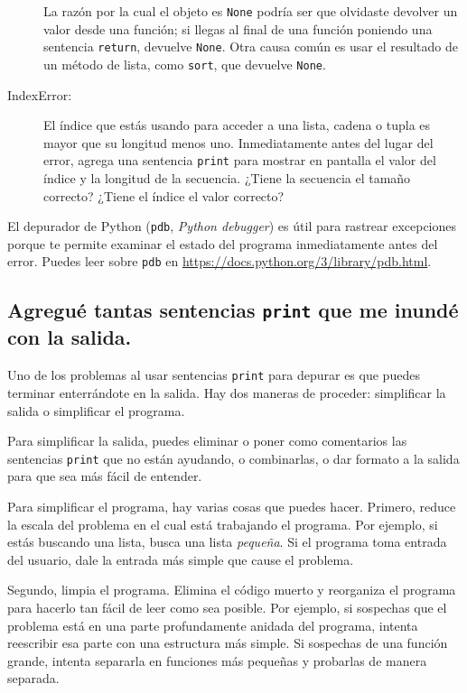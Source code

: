 \documentclass[10pt]{book}
\begin{document}
\begin{description}
La razón por la cual el objeto es {\tt None} podría ser que olvidaste
devolver un valor desde una función; si llegas al final de
una función poniendo una sentencia {\tt return}, devuelve
{\tt None}.  Otra causa común es usar el resultado de
un método de lista, como {\tt sort}, que devuelve {\tt None}.

\item[IndexError:] El índice que estás usando
para acceder a una lista, cadena o tupla es mayor que
su longitud menos uno.  Inmediatamente antes del lugar del error,
agrega una sentencia {\tt print} para mostrar en pantalla
el valor del índice y la longitud de la secuencia.
¿Tiene la secuencia el tamaño correcto?  ¿Tiene el índice el valor correcto?

\end{description}

El depurador de Python ({\tt pdb}, {\em Python debugger}) es útil para rastrear
excepciones porque te permite examinar el estado del
programa inmediatamente antes del error.  Puedes leer
sobre {\tt pdb} en \url{https://docs.python.org/3/library/pdb.html}.


\subsection{Agregué tantas sentencias {\tt print} que me inundé con
la salida.}

Uno de los problemas al usar sentencias {\tt print} para depurar
es que puedes terminar enterrándote en la salida.  Hay dos maneras
de proceder: simplificar la salida o simplificar el programa.

Para simplificar la salida, puedes eliminar o poner como comentarios
las sentencias {\tt print} que no están ayudando, o combinarlas, o dar formato
a la salida para que sea más fácil de entender.

Para simplificar el programa, hay varias cosas que puedes hacer.  Primero,
reduce la escala del problema en el cual está trabajando el programa.  Por
ejemplo, si estás buscando una lista, busca una lista {\em pequeña}.  Si el
programa toma entrada del usuario, dale la entrada más simple que cause el
problema.

Segundo, limpia el programa.  Elimina el código muerto y reorganiza el
programa para hacerlo tan fácil de leer como sea posible.  Por ejemplo, si
sospechas que el problema está en una parte profundamente anidada del programa,
intenta reescribir esa parte con una estructura más simple.  Si sospechas de
una función grande, intenta separarla en funciones más pequeñas y probarlas
de manera separada.
\end{document}
